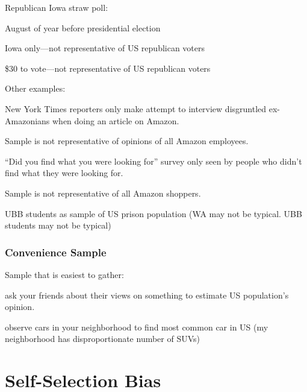 \documentclass[landscape]{exam}
\begin{document}
  Republican Iowa straw poll:
  \begin{itemize*}
    \item August of year before presidential election
    \item Iowa only---not representative of US republican voters
    \item \$30 to vote---not representative of US republican voters
  \end{itemize*}

  Other examples:
  \begin{itemize*}
    \item New York Times reporters only make attempt to interview disgruntled
      ex-Amazonians when doing an article on Amazon. 

      Sample is not representative of opinions of all Amazon employees.

    \item ``Did you find what you were looking for'' survey only seen by people
      who didn't find what they were looking for.

      Sample is not representative of all Amazon shoppers.

    \item UBB students as sample of US prison population (WA may not be typical.
      UBB students may not be typical)

  \end{itemize*}

  \subsubsection{Convenience Sample}

  Sample that is easiest to gather:

  \begin{itemize*}

    \item ask your friends about their views on something to estimate US
      population's opinion.

    \item observe cars in your neighborhood to find most common car in US (my
      neighborhood has disproportionate number of SUVs)


  \end{itemize*}

  \section{Self-Selection Bias}
\end{document}
